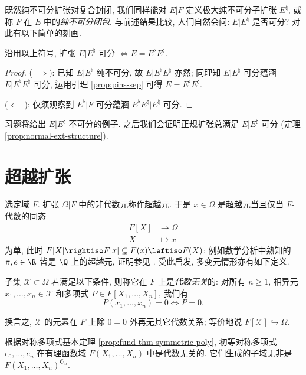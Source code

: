 既然纯不可分扩张对复合封闭, 我们同样能对 $E|F$ 定义极大纯不可分子扩张 $E^\natural$, 或称 $F$ 在 $E$ 中的\emph{纯不可分闭包}. 与前述结果比较, 人们自然会问: $E|E^\natural$ 是否可分? 对此有以下简单的刻画.
\begin{proposition}\label{prop:pins-compositum}
	沿用以上符号, 扩张 $E|E^\natural$ 可分 $\iff E = E^\flat E^\natural$.
\end{proposition}
\begin{proof}
	($\implies$): 已知 $E|E^\flat$ 纯不可分, 故 $E | E^\flat E^\natural$ 亦然; 同理知 $E|E^\natural$ 可分蕴涵 $E | E^\flat E^\natural$ 可分, 运用引理 \ref{prop:pins-sep} 可得 $E = E^\flat E^\natural$.
	
	($\impliedby$): 仅须观察到 $E^\flat|F$ 可分蕴涵 $E^\flat E^\natural | E^\natural$ 可分.
\end{proof}
习题将给出 $E|E^\natural$ 不可分的例子. 之后我们会证明正规扩张总满足 $E|E^\natural$ 可分 (定理 \ref{prop:normal-ext-structure}).

\section{超越扩张}
选定域 $F$. 扩张 $\Omega|F$ 中的非代数元称作超越元. 于是 $x \in \Omega$ 是超越元当且仅当 $F$-代数的同态
\begin{align*}
	F[X] & \longrightarrow \Omega \\
	X & \longmapsto x
\end{align*}
为单, 此时 $F[X] \rightiso F[x] \subsetneq F(x) \leftiso F(X)$; 例如数学分析中熟知的 $\pi, e \in \R$ 皆是 $\Q$ 上的超越元, 证明参见 \cite[\S 7]{ZhP}. 受此启发, 多变元情形亦有如下定义.

\begin{definition}\label{def:alg-indep}
	子集 $\mathcal{X} \subset \Omega$ 若满足以下条件, 则称它在 $F$ 上是\emph{代数无关}的: 对所有 $n \geq 1$, 相异元 $x_1, \ldots, x_n \in \mathcal{X}$ 和多项式 $P \in F[X_1, \ldots, X_n]$, 我们有
	\[ P(x_1, \ldots, x_n)=0 \iff P=0. \]
\end{definition}
换言之, $\mathcal{X}$ 的元素在 $F$ 上除 $0=0$ 外再无其它代数关系; 等价地说 $F[\mathcal{X}] \hookrightarrow \Omega$.

\begin{example}
	根据对称多项式基本定理 \ref{prop:fund-thm-symmetric-poly}, 初等对称多项式 $e_0, \ldots, e_n$ 在有理函数域 $F(X_1, \ldots, X_n)$ 中是代数无关的. 它们生成的子域无非是 $F(X_1, \ldots, X_n)^{\mathfrak{S}_n}$.
\end{example}

